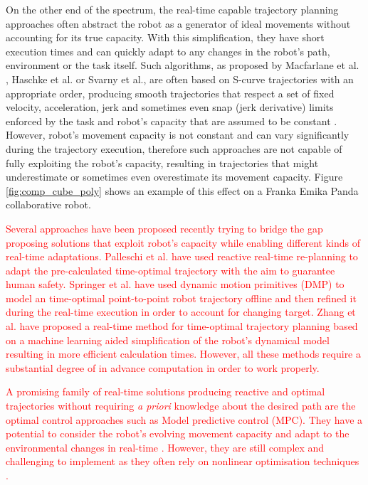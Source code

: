 On the other end of the spectrum, the real-time capable trajectory planning approaches often abstract the robot as a generator of ideal movements without accounting for its true capacity. With this simplification, they have short execution times and can quickly adapt to any changes in the robot's path, environment or the task itself. Such algorithms, as proposed by Macfarlane et al. \cite{Macfarlane2003}, Haschke et al. \cite{haschke2008line} or Svarny et al.\cite{Svarny2022}, are often based on S-curve trajectories \cite{FANG2019} with an appropriate order, producing smooth trajectories that respect a set of fixed velocity, acceleration, jerk and sometimes even snap (jerk derivative) limits enforced by the task and robot's capacity that are assumed to be constant \cite{modernrobotics}. However, robot's movement capacity is not constant and can vary significantly during the trajectory execution, therefore such approaches are not capable of fully exploiting the robot's capacity, resulting in trajectories that might underestimate or sometimes even overestimate its movement capacity. Figure \ref{fig:comp_cube_poly} shows an example of this effect on a Franka Emika Panda collaborative robot.


\textcolor{red}{
Several approaches have been proposed recently trying to bridge the gap proposing solutions that exploit robot's capacity while enabling different kinds of real-time adaptations. Palleschi et al.\cite{Palleschi2021} have used reactive real-time re-planning to adapt the pre-calculated time-optimal trajectory with the aim to guarantee human safety. Springer et al. \cite{dmp2014} have used dynamic motion primitives (DMP) to model an time-optimal point-to-point robot trajectory offline and then refined it during the real-time execution in order to account for changing target. Zhang et al. \cite{ZHANG2020} have proposed a real-time method for time-optimal trajectory planning based on a machine learning aided simplification of the robot's dynamical model resulting in more efficient calculation times. However, all these methods require a substantial degree of in advance computation in order to work properly.
}

\textcolor{red}{
A promising family of real-time solutions producing reactive and optimal trajectories without requiring \textit{a priori} knowledge about the desired path are the optimal control approaches such as Model predictive control (MPC). They have a potential to consider the robot's evolving movement capacity and adapt to the environmental changes in real-time \cite{torresalberto2022}\cite{Eckhoff2022}. However, they are still complex and challenging to implement as they often rely on nonlinear optimisation techniques \cite{kelff2021,Massaro2023}.}


